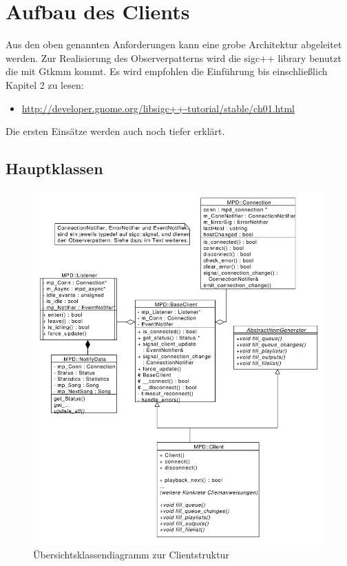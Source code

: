 \section{Aufbau des Clients}

Aus den oben genannten Anforderungen kann eine grobe Architektur abgeleitet werden.
Zur Realisierung des Observerpatterns wird die sigc++ library benutzt die mit Gtkmm kommt.
Es wird empfohlen die Einführung bis einschließlich Kapitel 2 zu lesen:
\begin{itemize}
\item \url{http://developer.gnome.org/libsigc++-tutorial/stable/ch01.html}
\end{itemize}
Die ersten Einsätze werden auch noch tiefer erklärt.

\newpage
\subsection{Hauptklassen}
\begin{figure}[htb!]
	\centering
        \includegraphics[scale=0.5]{./gfx/class/client}
	\caption{Übersichtsklassendiagramm zur Clientstruktur}
	\label{class_client_all}
\end{figure}

